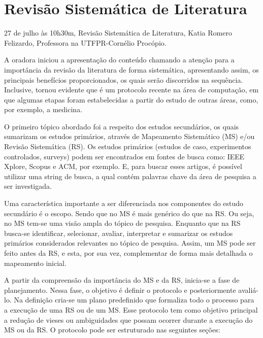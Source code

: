 \section{Revisão Sistemática de Literatura}

\begin{center}
  \vspace{1cm}
  27 de julho às 10h30m, Revisão Sistemática de Literatura, Katia Romero Felizardo, Professora na UTFPR-Cornélio Procópio.
  \vspace{1cm}
\end{center}

A oradora iniciou a apresentação do conteúdo chamando a atenção para a importância da revisão da literatura de forma sistemática, apresentando assim, os principais benefícios proporcionados, os quais serão discorridos na sequência. Inclusive, tornou evidente que é um protocolo recente na área de computação, em que algumas etapas foram estabelecidas a partir do estudo de outras áreas, como, por exemplo, a medicina.

O primeiro tópico abordado foi a respeito dos estudos secundários, os quais sumarizam os estudos primários, através de Mapeamento Sistemático (MS) e/ou Revisão Sistemática (RS). Os estudos primários (estudos de caso, experimentos controlados, surveys) podem ser encontrados em fontes de busca como: IEEE Xplore, Scopus e ACM, por exemplo. E, para buscar esses artigos, é possível utilizar uma string de busca, a qual contém palavras chave da área de pesquisa a ser investigada.

Uma característica importante a ser diferenciada nos componentes do estudo secundário é o escopo. Sendo que no MS é mais genérico do que na RS. Ou seja, no MS tem-se uma visão ampla do tópico de pesquisa. Enquanto que na RS busca-se identificar, selecionar, avaliar, interpretar e sumarizar os estudos primários considerados relevantes no tópico de pesquisa. Assim, um MS pode ser feito antes da RS, e esta, por sua vez, complementar de forma mais detalhada o mapeamento inicial.

A partir da compreensão da importância do MS e da RS, inicia-se a fase de planejamento. Nessa fase, o objetivo é definir o protocolo e posteriormente avaliá-lo. Na definição cria-se um plano predefinido que formaliza todo o processo para a execução de uma RS ou de um MS. Esse protocolo tem como objetivo principal a redução de vieses ou ambiguidades que possam ocorrer durante a execução do MS ou da RS. O protocolo pode ser estruturado nas seguintes seções:

